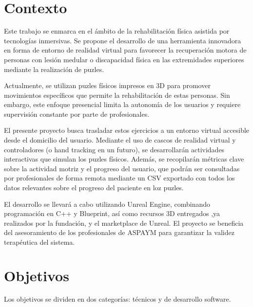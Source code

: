 
\section{Contexto}
\label{contexto}
Este trabajo se enmarca en el ámbito de la rehabilitación física asistida por tecnologías inmersivas. Se propone el desarrollo de una herramienta innovadora en forma de entorno de realidad virtual para favorecer la recuperación motora de personas con lesión medular o discapacidad física en las extremidades superiores mediante la realización de puzles.

Actualmente, se utilizan puzles físicos impresos en 3D para promover movimientos específicos que permite la rehabilitación de estas personas. Sin embargo, este enfoque presencial limita la autonomía de los usuarios y requiere supervisión constante por parte de profesionales.

El presente proyecto busca trasladar estos ejercicios a un entorno virtual accesible desde el domicilio del usuario. Mediante el uso de cascos de realidad virtual y controladores (o hand tracking en un futuro), se desarrollarán actividades interactivas que simulan los puzles físicos. Además, se recopilarán métricas clave sobre la actividad motriz y el progreso del usuario, que podrán ser consultadas por profesionales de forma remota mediante un CSV exportado con todos los datos relevantes sobre el progreso del paciente en loz puzles.

El desarrollo se llevará a cabo utilizando Unreal Engine, combinando programación en C++ y Blueprint, así como recursos 3D entregados ,ya realizados por la fundación, y el marketplace de Unreal. El proyecto se beneficia del asesoramiento de los profesionales de ASPAYM para garantizar la validez terapéutica del sistema.

\section{Objetivos}
Los objetivos se dividen en dos categorías: técnicos y de desarrollo software.

